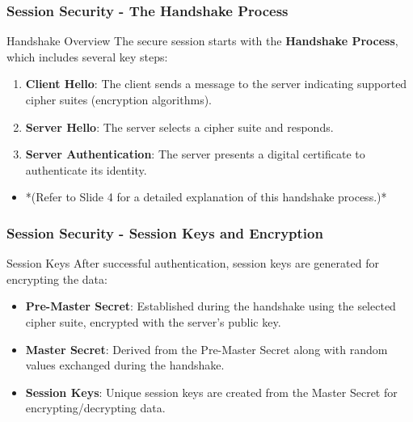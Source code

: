 \documentclass{beamer}
\begin{document}
\begin{frame}[fragile]
    \frametitle{Session Security - The Handshake Process}
    \begin{block}{Handshake Overview}
        The secure session starts with the \textbf{Handshake Process}, which includes several key steps:
    \end{block}
    \begin{enumerate}
        \item \textbf{Client Hello}: The client sends a message to the server indicating supported cipher suites (encryption algorithms).
        \item \textbf{Server Hello}: The server selects a cipher suite and responds.
        \item \textbf{Server Authentication}: The server presents a digital certificate to authenticate its identity.
    \end{enumerate}
    \begin{itemize}
        \item *(Refer to Slide 4 for a detailed explanation of this handshake process.)*
    \end{itemize}
\end{frame}

\begin{frame}[fragile]
    \frametitle{Session Security - Session Keys and Encryption}
    \begin{block}{Session Keys}
        After successful authentication, session keys are generated for encrypting the data:
    \end{block}
    \begin{itemize}
        \item \textbf{Pre-Master Secret}: Established during the handshake using the selected cipher suite, encrypted with the server's public key.
        \item \textbf{Master Secret}: Derived from the Pre-Master Secret along with random values exchanged during the handshake.
        \item \textbf{Session Keys}: Unique session keys are created from the Master Secret for encrypting/decrypting data.
    \end{itemize}
\end{frame}
\end{document}
